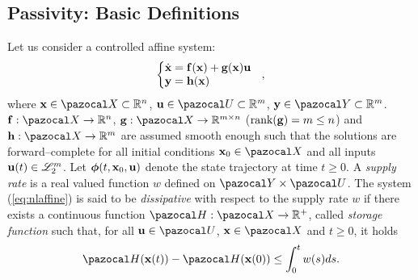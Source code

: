 \subsection{Passivity: Basic Definitions}
%
Let us consider a controlled affine system:
\begin{equation}\label{eq:nlaffine}
    \left\{
    \begin{matrix*}[l]
        \dot{\xb} = \fb(\xb) + \gb(\xb)\ub\\
        \yb = \hb(\xb)
    \end{matrix*}
    \right.~~,
\end{equation}
where $\xb\in\X\subset\R^n$, $\ub\in\U\subset\R^m$, $\yb\in\Y\subset\R^m$. $\fb:\X\rightarrow\R^n$, $\gb:\X\rightarrow\R^{m\times n}$ ($\text{rank}(\mathbf{g})= m\leq n$) and $\hb:\X\rightarrow\R^m$ are assumed smooth enough such that the solutions are forward--complete for all initial conditions $\xb_0\in\X$ and all inputs $\mathbf{u}(t)\in\mathcal{L}_2^m$. Let $\bm\phi(t,\mathbf{x}_0,\mathbf{u})$ denote the state trajectory at time $t\geq0$.
%
A \textit{supply rate} is a real valued function $w$ defined on $\Y\times\U$. The  system (\ref{eq:nlaffine}) is said to be \textit{dissipative} with respect to the supply rate $w$ if there exists a continuous function $\Ha:\X\rightarrow\R^+$, called \textit{storage function} such that, for all $\ub\in\U$, $\xb\in\X$ and $t\geq 0$, it holds
%
\begin{equation}
    \Ha(\xb(t))-\Ha(\xb(0)) \leq \int_0^tw(s)ds.
\end{equation}
%

